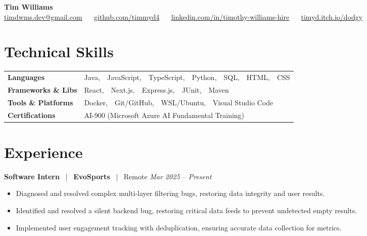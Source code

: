 \documentclass[10pt, letterpaper]{article}
\newcommand{\jobhead}[4]{%
  \vspace{5pt}%
  {\bfseries\color{dark}#1}%
  ~{\color{light}|}~%
  {\bfseries\color{navy}#2}%
  ~{\color{light}|}~%
  {\color{light}#3}%
  \hfill{\color{light}\small\textit{#4}}\\[-2pt]%
}
\newcommand{\skillrow}[2]{%
  {\bfseries #1} & #2 \\[2pt]%
}
\begin{document}

\begin{center}
  {\huge\bfseries\color{navy} Tim Williams}\\[4pt]
  {\small\color{light}
    \href{mailto:timdwms.dev@gmail.com}{timdwms.dev@gmail.com}
    ~\textbullet~
    \href{https://github.com/timmyd4}{github.com/timmyd4}
    ~\textbullet~
    \href{https://www.linkedin.com/in/timothy-williams-hire}{linkedin.com/in/timothy-williams-hire}
    ~\textbullet~
    \href{https://timyd.itch.io/dodgy}{timyd.itch.io/dodgy}
  }
\end{center}

\vspace{2pt}

\section{Technical Skills}

\begin{tabular}{@{}p{1.6in} p{5.2in}@{}}
  \skillrow{Languages}{Java,\ \ JavaScript,\ \ TypeScript,\ \ Python,\ \ SQL,\ \ HTML,\ \ CSS}
  \skillrow{Frameworks \& Libs}{React,\ \ Next.js,\ \ Express.js,\ \ JUnit,\ \ Maven}
  \skillrow{Tools \& Platforms}{Docker,\ \ Git/GitHub,\ \ WSL/Ubuntu,\ \ Visual Studio Code}
  \skillrow{Certifications}{AI-900 (Microsoft Azure AI Fundamental Training)}
\end{tabular}

\section{Experience}

\jobhead{Software Intern}{EvoSports}{Remote}{Mar 2025 – Present}
\begin{itemize}
  \item Diagnosed and resolved complex multi-layer filtering bugs, restoring data integrity and user results.
  \item Identified and resolved a silent backend bug, restoring critical data feeds to prevent undetected empty results.
  \item Implemented user engagement tracking with deduplication, ensuring accurate data collection for metrics.
\end{itemize}
\end{document}
